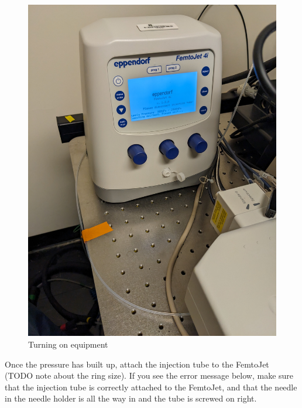 \documentclass[
  letterpaper,
  DIV=11,
  numbers=noendperiod]{scrartcl}
\begin{document}
\begin{figure}
\begin{minipage}[t]{0.33\linewidth}
{{\includegraphics{micro_photos/included/microinjector_build_pressure.jpg}

}

}

\end{minipage}%

\caption{\label{fig-eggs}Turning on equipment}

\end{figure}

Once the pressure has built up, attach the injection tube to the
FemtoJet (TODO note about the ring size). If you see the error message
below, make sure that the injection tube is correctly attached to the
FemtoJet, and that the needle in the needle holder is all the way in and
the tube is screwed on right.
\end{document}
